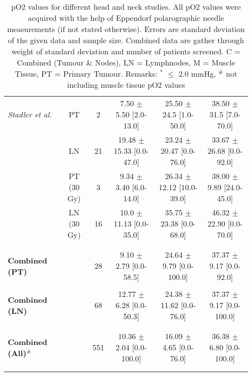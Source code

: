 \begin{sidewaystable}[p]
\begin{tabular}{lccccc}
\textit{Stadler et al.}\cite{pmid9783887}		& PT & 2 & 7.50 $\pm$ 5.50 [2.0-13.0] & 25.50 $\pm$ 24.5 [1.0-50.0] & 38.50 $\pm$ 31.5 [7.0-70.0]\\
									& LN & 21 &  19.48 $\pm$ 15.33 [0.0-47.0] & 23.24 $\pm$ 20.47 [0.0-76.0] & 33.67 $\pm$ 26.68 [0.0-92.0]\\
									& PT (30 Gy) & 3 &  9.34 $\pm$ 3.40 [6.0-14.0] & 26.34 $\pm$ 12.12 [10.0-39.0] & 38.00 $\pm$ 9.89 [24.0-45.0]\\
									& LN (30 Gy) & 16 &  10.0 $\pm$ 11.13 [0.0-35.0] & 35.75 $\pm$ 23.38 [0.0-68.0] & 46.32 $\pm$ 22.90 [0.0-70.0]\\\\
\bottomrule\\
\textbf{Combined (PT)} & & 28 & 9.10 $\pm$ 2.79 [0.0-58.5] & 24.64 $\pm$ 9.79 [0.0-100.0] & 37.37 $\pm$ 9.17 [0.0-92.0]\\\\
\textbf{Combined (LN)} & & 68 & 12.77 $\pm$ 6.28 [0.0-50.3] & 24.38 $\pm$ 11.62 [0.0-76.0] & 37.37 $\pm$ 9.17 [0.0-100.0]\\\\
\bottomrule\\
\textbf{Combined (All)}$^\#$ & & 551 & 10.36 $\pm$ 2.04 [0.0-100.0] & 16.09 $\pm$ 4.65 [0.0-76.0] & 36.38 $\pm$ 6.80 [0.0-100.0]\\\\\\
\end{tabular}
\caption{pO2 values for different head and neck studies. All pO2 values were acquired with the help of Eppendorf polarographic needle measurements (if not stated otherwise). Errors are standard deviation of the given data and sample size. Combined data are gather through weight of standard deviation and number of patients screened. C = Combined (Tumour \& Nodes), LN = Lymphnodes, M = Muscle Tissue, PT = Primary Tumour. Remarks: $^*$ $\leq$ 2.0 mmHg, $^\#$ not including muscle tissue pO2 values}
\label{tab:po2parameter}
\end{sidewaystable}
